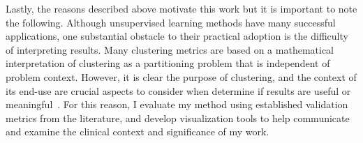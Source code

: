 

Lastly, the reasons described above motivate this work but it is important to note the following.  Although unsupervised learning methods have many successful applications, one substantial obstacle to their practical adoption is the difficulty of interpreting results.  Many clustering metrics are based on a mathematical interpretation of clustering as a partitioning problem that is independent of problem context.  However, it is clear the purpose of clustering, and the context of its end-use are crucial aspects to consider when determine if results are useful or meaningful~\cite{Guyon}. For this reason, I evaluate my method using established validation metrics from the literature, and develop visualization tools to help communicate and examine the clinical context and significance of my work.




